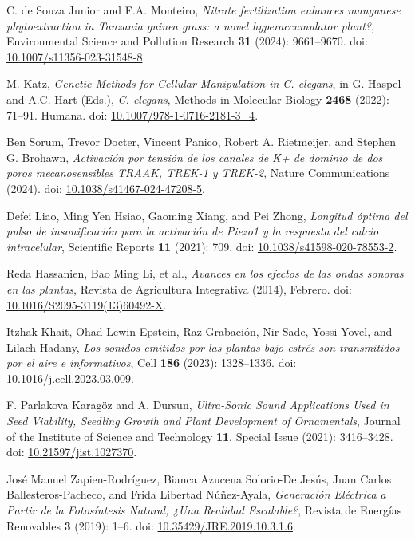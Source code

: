 \documentclass[twocolumn]{article}
\begin{document}
\begin{thebibliography}{99}
C. de Souza Junior and F.A. Monteiro,
\textit{Nitrate fertilization enhances manganese phytoextraction in Tanzania guinea grass: a novel hyperaccumulator plant?},
Environmental Science and Pollution Research \textbf{31} (2024): 9661--9670. doi: \url{10.1007/s11356-023-31548-8}.

M. Katz,
\textit{Genetic Methods for Cellular Manipulation in \textit{C. elegans}},
in G. Haspel and A.C. Hart (Eds.), \textit{C. elegans}, Methods in Molecular Biology \textbf{2468} (2022): 71--91. Humana. doi: \url{10.1007/978-1-0716-2181-3_4}.

Ben Sorum, Trevor Docter, Vincent Panico, Robert A. Rietmeijer, and Stephen G. Brohawn,
\textit{Activación por tensión de los canales de K+ de dominio de dos poros mecanosensibles TRAAK, TREK-1 y TREK-2},
Nature Communications (2024). doi: \url{10.1038/s41467-024-47208-5}.

Defei Liao, Ming Yen Hsiao, Gaoming Xiang, and Pei Zhong,
\textit{Longitud óptima del pulso de insonificación para la activación de Piezo1 y la respuesta del calcio intracelular},
Scientific Reports \textbf{11} (2021): 709. doi: \url{10.1038/s41598-020-78553-2}.

Reda Hassanien, Bao Ming Li, et al.,
\textit{Avances en los efectos de las ondas sonoras en las plantas},
Revista de Agricultura Integrativa (2014), Febrero. doi: \url{10.1016/S2095-3119(13)60492-X}.

Itzhak Khait, Ohad Lewin-Epstein, Raz Grabación, Nir Sade, Yossi Yovel, and Lilach Hadany,
\textit{Los sonidos emitidos por las plantas bajo estrés son transmitidos por el aire e informativos},
Cell \textbf{186} (2023): 1328--1336. doi: \url{10.1016/j.cell.2023.03.009}.

F. Parlakova Karagöz and A. Dursun,
\textit{Ultra-Sonic Sound Applications Used in Seed Viability, Seedling Growth and Plant Development of Ornamentals},
Journal of the Institute of Science and Technology \textbf{11}, Special Issue (2021): 3416--3428. doi: \url{10.21597/jist.1027370}.

José Manuel Zapien-Rodríguez, Bianca Azucena Solorio-De Jesús, Juan Carlos Ballesteros-Pacheco, and Frida Libertad Núñez-Ayala,
\textit{Generación Eléctrica a Partir de la Fotosíntesis Natural; ¿Una Realidad Escalable?},
Revista de Energías Renovables \textbf{3} (2019): 1--6. doi: \url{10.35429/JRE.2019.10.3.1.6}.

\end{thebibliography}
\end{document}
